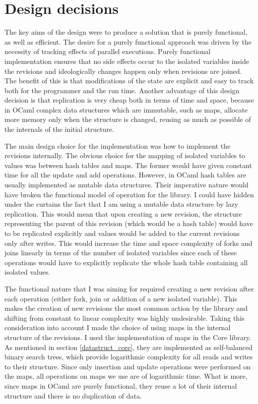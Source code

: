\documentclass[12pt,twoside,notitlepage]{report}
\begin{document}
\section{Design decisions}

The key aims of the design were to produce a solution that is purely functional, as well as efficient. The desire for a purely functional approach was driven by the necessity of tracking effects of parallel executions. Purely functional implementation ensures that no side effects occur to the isolated variables inside the revisions and ideologically changes happen only when revisions are joined. The benefit of this is that modifications of the state are explicit and easy to track both for the programmer and the run time. Another advantage of this design decision is that replication is very cheap both in terms of time and space, because in OCaml complex data structures which are immutable, such as maps, allocate more memory only when the structure is changed, reusing as much as possible of the internals of the initial structure.

The main design choice for the implementation was how to implement the revisions internally. The obvious choice for the mapping of isolated variables to values was between hash tables and maps. The former would have given constant time for all the update and add operations. However, in OCaml hash tables are usually implemented as mutable data structures. Their imperative nature would have broken the functional model of operation for the library. I could have hidden under the curtains the fact that I am using a mutable data structure by lazy replication. This would mean that upon creating a new revision, the structure representing the parent of this revision (which would be a hash table) would have to be replicated explicitly and values would be added to the current revisions only after writes. This would increase the time and space complexity of forks and joins linearly in terms of the number of isolated variables since each of these operations would have to explicitly replicate the whole hash table containing all isolated values. 

The functional nature that I was aiming for required creating a new revision after each operation (either fork, join or addition of a new isolated variable). This makes the creation of new revisions the most common action by the library and shifting from constant to linear complexity was highly undesirable. Taking this consideration into account I made the choice of using maps in the internal structure of the revisions. I used the implementation of maps in the Core library. As mentioned in section \ref{datastruct_core}, they are implemented as self-balanced binary search trees, which provide logarithmic complexity for all reads and writes to their structure. Since only insertion and update operations were performed on the maps, all operations on maps we use are of logarithmic time. What is more, since maps in OCaml are purely functional, they reuse a lot of their internal structure and there is no duplication of data. 
\end{document}
